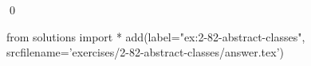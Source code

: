 
\begin{ex}
  \label{ex:2-82-abstract-classes}
  
  \qed
\end{ex}
\begin{python0}
from solutions import *
add(label="ex:2-82-abstract-classes",
    srcfilename='exercises/2-82-abstract-classes/answer.tex')
\end{python0}
